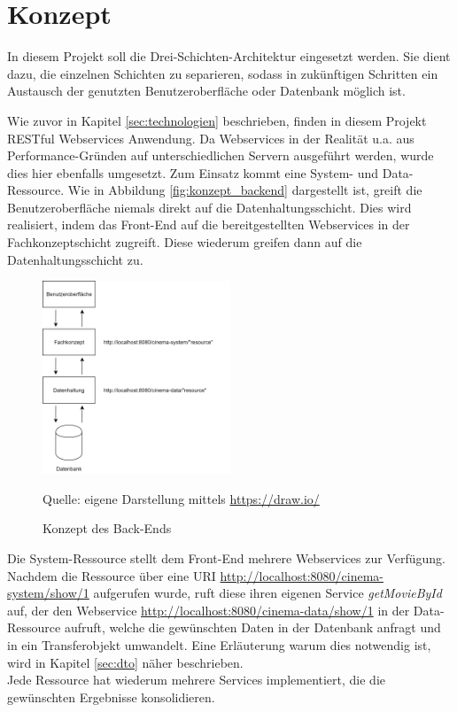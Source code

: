 \section{Konzept}
\label{sec:konzept}
In diesem Projekt soll die Drei-Schichten-Architektur eingesetzt werden.
Sie dient dazu, die einzelnen Schichten zu separieren, sodass in zukünftigen Schritten ein Austausch der genutzten Benutzeroberfläche oder Datenbank möglich ist. 

Wie zuvor in Kapitel \vref{sec:technologien} beschrieben, finden in diesem Projekt \acs{REST}ful Webservices Anwendung.
Da Webservices in der Realität u.a. aus Performance-Gründen auf unterschiedlichen Servern ausgeführt werden, wurde dies hier ebenfalls umgesetzt.
Zum Einsatz kommt eine System- und Data-Ressource.
Wie in Abbildung \vref{fig:konzept_backend} dargestellt ist, greift die Benutzeroberfläche niemals direkt auf die Datenhaltungsschicht.
Dies wird realisiert, indem das Front-End auf die bereitgestellten Webservices in der Fachkonzeptschicht zugreift.
Diese wiederum greifen dann auf die Datenhaltungsschicht zu.

\begin{figure}[ht]
	\centering
	\includegraphics[width=0.5\textwidth]{img/backend/drei-schichten-architektur}
	\captionsetup{format=hang}
	\caption{Konzept des Back-Ends}
	\small Quelle: eigene Darstellung mittels \url{https://draw.io/}
	\label{fig:konzept_backend}
	\end{figure}

Die System-Ressource stellt dem Front-End mehrere Webservices zur Verfügung.
Nachdem die Ressource über eine \acs{URI} \url{http://localhost:8080/cinema-system/show/1} aufgerufen wurde, ruft diese ihren eigenen Service \textit{getMovieById} auf, der den Webservice \url{http://localhost:8080/cinema-data/show/1} in der Data-Ressource aufruft, welche die gewünschten Daten in der Datenbank anfragt und in ein Transferobjekt umwandelt.
Eine Erläuterung warum dies notwendig ist, wird in Kapitel \vref{sec:dto} näher beschrieben. \\
Jede Ressource hat wiederum mehrere Services implementiert, die die gewünschten Ergebnisse konsolidieren.

